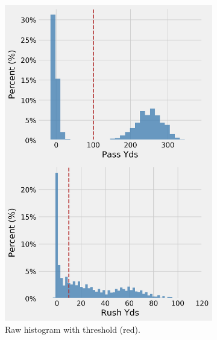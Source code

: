 \documentclass[12pt]{article}
\begin{document}
\begin{figure}[H]
  \centering
  \begin{subfigure}[b]{0.450\textwidth}
    \centering
    \includegraphics[width=1\textwidth]{../figures/no_theshold_example_hists}
    \caption{Raw histogram with threshold (red).}
    \label{example hist pass yds}
  \end{subfigure}
  \hfill
  \begin{subfigure}[b]{0.450\textwidth}
    \centering

\end{subfigure}
\end{figure}
\end{document}
